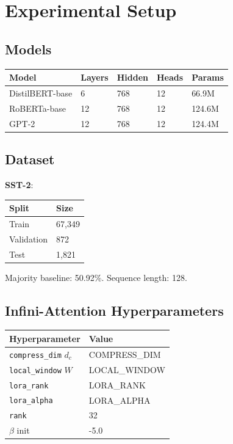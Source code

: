 
\section{Experimental Setup}

\subsection{Models}

\begin{table}[H]
\centering
\small
\begin{tabular}{lllll}
\toprule
\textbf{Model} & \textbf{Layers} & \textbf{Hidden} & \textbf{Heads} & \textbf{Params} \\
\midrule
DistilBERT-base & 6 & 768 & 12 & 66.9M \\
RoBERTa-base & 12 & 768 & 12 & 124.6M \\
GPT-2 & 12 & 768 & 12 & 124.4M \\
\bottomrule
\end{tabular}
\end{table}

\subsection{Dataset}

\textbf{SST-2}:

\begin{table}[H]
\centering
\small
\begin{tabular}{ll}
\toprule
\textbf{Split} & \textbf{Size} \\
\midrule
Train & 67,349 \\
Validation & 872 \\
Test & 1,821 \\
\bottomrule
\end{tabular}
\end{table}

Majority baseline: 50.92\%. Sequence length: 128.

\subsection{Infini-Attention Hyperparameters}

\begin{table}[H]
\centering
\small
\begin{tabular}{ll}
\toprule
\textbf{Hyperparameter} & \textbf{Value} \\
\midrule
\texttt{compress\_dim} $d_c$ & {{COMPRESS\_DIM}} \\
\texttt{local\_window} $W$ & {{LOCAL\_WINDOW}} \\
\texttt{lora\_rank} & {{LORA\_RANK}} \\
\texttt{lora\_alpha} & {{LORA\_ALPHA}} \\
\texttt{rank} & 32 \\
$\beta$ init & -5.0 \\
\bottomrule
\end{tabular}
\end{table}

